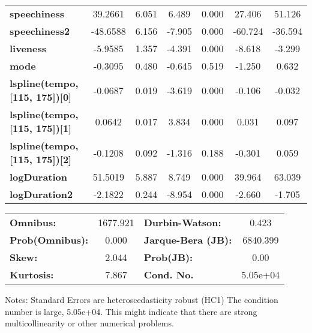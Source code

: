 \begin{center}
\begin{tabular}{lcccccc}
\textbf{speechiness}                   &      39.2661  &        6.051     &     6.489  &         0.000        &       27.406    &       51.126     \\
\textbf{speechiness2}                  &     -48.6588  &        6.156     &    -7.905  &         0.000        &      -60.724    &      -36.594     \\
\textbf{liveness}                      &      -5.9585  &        1.357     &    -4.391  &         0.000        &       -8.618    &       -3.299     \\
\textbf{mode}                          &      -0.3095  &        0.480     &    -0.645  &         0.519        &       -1.250    &        0.632     \\
\textbf{lspline(tempo, [115, 175])[0]} &      -0.0687  &        0.019     &    -3.619  &         0.000        &       -0.106    &       -0.032     \\
\textbf{lspline(tempo, [115, 175])[1]} &       0.0642  &        0.017     &     3.834  &         0.000        &        0.031    &        0.097     \\
\textbf{lspline(tempo, [115, 175])[2]} &      -0.1208  &        0.092     &    -1.316  &         0.188        &       -0.301    &        0.059     \\
\textbf{logDuration}                   &      51.5019  &        5.887     &     8.749  &         0.000        &       39.964    &       63.039     \\
\textbf{logDuration2}                  &      -2.1822  &        0.244     &    -8.954  &         0.000        &       -2.660    &       -1.705     \\
\bottomrule
\end{tabular}
\begin{tabular}{lclc}
\textbf{Omnibus:}       & 1677.921 & \textbf{  Durbin-Watson:     } &    0.423  \\
\textbf{Prob(Omnibus):} &   0.000  & \textbf{  Jarque-Bera (JB):  } & 6840.399  \\
\textbf{Skew:}          &   2.044  & \textbf{  Prob(JB):          } &     0.00  \\
\textbf{Kurtosis:}      &   7.867  & \textbf{  Cond. No.          } & 5.05e+04  \\
\bottomrule
\end{tabular}
\end{center}

Notes: \newline
 [1] Standard Errors are heteroscedasticity robust (HC1) \newline
 [2] The condition number is large, 5.05e+04. This might indicate that there are \newline
 strong multicollinearity or other numerical problems.